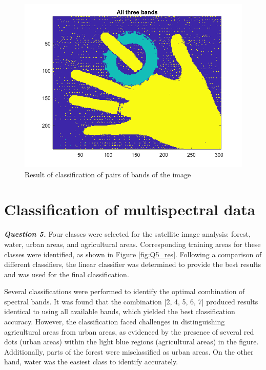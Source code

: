 \documentclass[12pt]{article}
\begin{document}
\begin{figure}[h!]
  \centering
  \includegraphics[width = 15cm]{images/Q4_3b.png}
  \caption{Result of classification of pairs of bands of the image}
  \label{fig:Q4_3}
\end{figure}

\section{Classification of multispectral data}
\textbf{\emph{Question 5.}}
Four classes were selected for the satellite image analysis: forest, water, urban areas, and agricultural areas. Corresponding training areas for these classes were identified, as shown in Figure \ref{fig:Q5_res}. Following a comparison of different classifiers, the linear classifier was determined to provide the best results and was used for the final classification.

Several classifications were performed to identify the optimal combination of spectral bands. It was found that the combination [2, 4, 5, 6, 7] produced results identical to using all available bands, which yielded the best classification accuracy. However, the classification faced challenges in distinguishing agricultural areas from urban areas, as evidenced by the presence of several red dots (urban areas) within the light blue regions (agricultural areas) in the figure. Additionally, parts of the forest were misclassified as urban areas. On the other hand, water was the easiest class to identify accurately.
\end{document}
